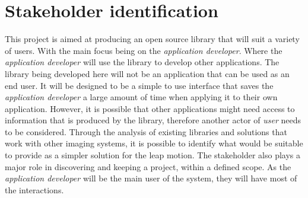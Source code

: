 \documentclass[11pt,oneside]{report}
\begin{document}
		\section{Stakeholder identification}
			This project is aimed at producing an open source library that will suit a variety of users.
			With the main focus being on the \textit{application developer}.
			Where the \textit{application developer} will use the library to develop other applications.
			The library being developed here will not be an application that can be used as an end user.
			It will be designed to be a simple to use interface that saves the \textit{application developer} a large amount of time when applying it to their own application.
			However, it is possible that other applications might need access to information that is produced by the library, therefore another actor of \textit{user} needs to be considered.
			Through the analysis of existing libraries and solutions that work with other imaging systems, it is possible to identify what would be suitable to provide as a simpler solution for the leap motion.
			The stakeholder also plays a major role in discovering and keeping a project, within a defined scope.
			As the \textit{application developer} will be the main user of the system, they will	have most of the interactions.
		
\end{document}

